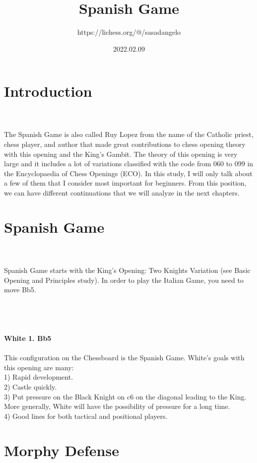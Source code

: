 \documentclass{article}
\title{Spanish Game}
\author{https://lichess.org/@/sasadangelo}
\date{2022.02.09}
\begin{document}
\begin{titlepage}
\maketitle
\end{titlepage}
\section{ Introduction}

\\
\\
The Spanish Game is also called Ruy Lopez from the name of the Catholic priest, chess player, and author that made great contributions to chess opening theory with this opening and the King's Gambit. The theory of this opening is very large and it includes a lot of variations classified with the code from 060 to 099 in the Encyclopaedia of Chess Openings (ECO). In this study, I will only talk about a few of them that I consider most important for beginners. From this position, we can have different continuations that we will analyze in the next chapters.\section{ Spanish Game}

\\
\\
Spanish Game starts with the King's Opening: Two Knights Variation (see Basic Opening and Principles study). In order to play the Italian Game, you need to move Bb5.\\\\
\\

\\
\\
\textbf{White 1. Bb5}\\
\\
This configuration on the Chessboard is the Spanish Game. White's goals with this opening are many:\\1) Rapid development.\\2) Castle quickly.\\3) Put pressure on the Black Knight on c6 on the diagonal leading to the King. More generally, White will have the possibility of pressure for a long time.\\4) Good lines for both tactical and positional players.\\\section{ Morphy Defense}
\end{document}
